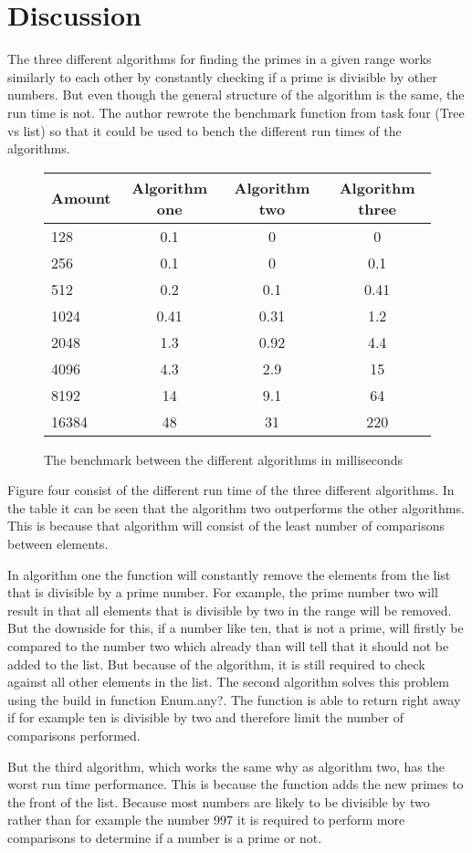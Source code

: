 \documentclass[a4paper,11pt]{article}
\begin{document}
\section*{Discussion}
The three different algorithms for finding the primes in a given range works similarly to each other by constantly checking if a prime is divisible by other numbers. But even though the general structure of the algorithm is the same, the run time is not. The author rewrote the benchmark function from task four (Tree vs list) so that it could be used to bench the different run times of the algorithms.

\begin{figure}[H]
\begin{center}
\begin{tabular}{l|c|c|c}
\textbf{Amount} & \textbf{Algorithm one} & \textbf{Algorithm two} & \textbf{Algorithm three}\\
\hline
  128 & 0.1 & 0 & 0\\
  256 & 0.1 & 0 & 0.1\\
  512 & 0.2 & 0.1 & 0.41\\
  1024 & 0.41 & 0.31 & 1.2\\
  2048 & 1.3 & 0.92 & 4.4\\
  4096 & 4.3 & 2.9 & 15\\
  8192 & 14 & 9.1 & 64\\
  16384 & 48 & 31 & 220\\
\end{tabular}
\caption{The benchmark between the different algorithms in milliseconds}
\label{Figure:4}
\end{center}
\end{figure}

Figure four consist of the different run time of the three different algorithms. In the table it can be seen that the algorithm two outperforms the other algorithms. This is because that algorithm will consist of the least number of comparisons between elements.

In algorithm one the function will constantly remove the elements from the list that is divisible by a prime number. For example, the prime number two will result in that all elements that is divisible by two in the range will be removed. But the downside for this, if a number like ten, that is not a prime, will firstly be compared to the number two which already than will tell that it should not be added to the list. But because of the algorithm, it is still required to check against all other elements in the list. The second algorithm solves this problem using the build in function Enum.any?. The function is able to return right away if for example ten is divisible by two and therefore limit the number of comparisons performed.

But the third algorithm, which works the same why as algorithm two, has the worst run time performance. This is because the function adds the new primes to the front of the list. Because most numbers are likely to be divisible by two rather than for example the number 997 it is required to perform more comparisons to determine if a number is a prime or not.
\end{document}
